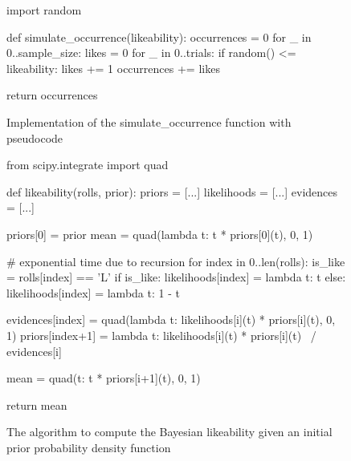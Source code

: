 \documentclass[a4paper,11pt]{article}
\begin{document}
\begin{figure}[H]
    \begin{pythonln}
import random

def simulate_occurrence(likeability):
    occurrences = 0
    for _ in 0..sample_size:
        likes = 0
        for _ in 0..trials:
            if random() <= likeability:
                likes += 1
            occurrences += likes

    return occurrences
    \end{pythonln}
    \caption{Implementation of the simulate\_occurrence function with pseudocode}
    \label{apd:sim_occ}
\end{figure}

\begin{figure}[H]
    \begin{pythonln}
from scipy.integrate import quad

def likeability(rolls, prior):
    priors = [...]
    likelihoods = [...]
    evidences = [...]

    priors[0] = prior
    mean = quad(lambda t: t * priors[0](t), 0, 1)

    # exponential time due to recursion
    for index in 0..len(rolls):
        is_like = rolls[index] == 'L'
        if is_like:
            likelihoods[index] = lambda t: t
        else:
            likelihoods[index] = lambda t: 1 - t

        evidences[index] = quad(lambda t: likelihoods[i](t) * priors[i](t),
                               0, 1)
        priors[index+1] = lambda t: likelihoods[i](t) * priors[i](t) \
                                / evidences[i]

        mean = quad(t: t * priors[i+1](t), 0, 1)

    return mean
    \end{pythonln}
    \caption{The algorithm to compute the Bayesian likeability given an initial prior probability density function}
    \label{apd:algo}
\end{figure}
\end{document}
